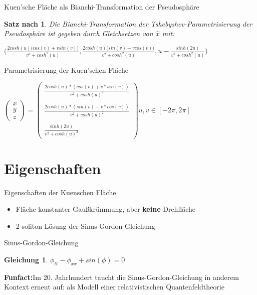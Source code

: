 \documentclass[12pt]{beamer}
\newtheorem{mythm}{Satz nach \cite{gray}}
\newtheorem{myeq}{Gleichung}
\begin{document}
\begin{frame}{Kuen'sche Fläche als Bianchi-Transformation der Pseudosphäre}
\begin{mythm}
Die Bianchi-Transformation der Tshebyshev-Parametrisierung der Pseudosphäre ist gegeben durch Gleichsetzen von $\hat{x}$ mit:
\begin{center}
$\Big(\frac{2cosh(u)\big(cos(v) + v sin(v)\big)}{v^2 + cosh^2(u)}, \frac{2cosh(u)\big(sin(v) - v cos(v)\big)}{v^2 + cosh^2(u)}, u - \frac{sinh(2u)}{v^2 + cosh^2(u)}\Big)$
\end{center}
\end{mythm}
\end{frame}

\begin{frame}{Parametrisierung der Kuen'schen Fläche}

\begin{center}
$
\begin{pmatrix}
x\\y\\z
\end{pmatrix}
 =
\begin{pmatrix}
\frac{2cosh(u)* \left( cos(v) + v*sin(v) \right)}{v^2+cosh(u)^2}\\\\
\frac{2cosh(u)*(sin(v) - v*cos(v))}{v^2 + cosh(u)^2}\\\\
\frac{sinh(2u)}{v^2 + cosh(u)^2}
\end{pmatrix}
u,v \in \left[ -2\pi , 2\pi \right] $
\end{center}

\end{frame}

\section{Eigenschaften}
\begin{frame}{Eigenschaften der Kuenschen Fläche}
\begin{itemize}
\item Fläche konstanter Gaußkrümmung, aber \textbf{keine} Drehfläche \cite{wuensch}
\item 2-soliton Lösung der Sinus-Gordon-Gleichung \cite{bruter}
\end{itemize}
\end{frame}

\begin{frame}{Sinus-Gordon-Gleichung}
\begin{myeq}
$\phi_{tt} - \phi_{xx} + sin( \phi ) = 0$
\end{myeq}
\textbf{Funfact:}\newline Im 20. Jahrhundert taucht die Sinus-Gordon-Gleichung in anderem Kontext erneut auf: als Modell einer relativistischen Quantenfeldtheorie\cite{bruter}
\end{frame}
\end{document}
